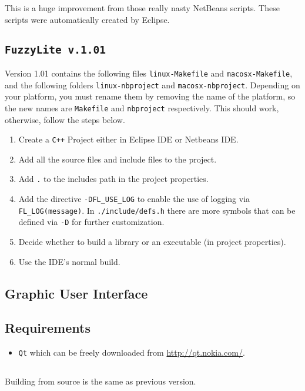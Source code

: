 	This is a huge improvement from those really nasty NetBeans scripts. These
	scripts were automatically created by Eclipse.

\subsection{\texttt{FuzzyLite v.1.01}}

	Version 1.01 contains the following files \texttt{linux-Makefile} and \texttt{macosx-Makefile}, and the following folders \texttt{linux-nbproject} and \texttt{macosx-nbproject}. Depending on your platform, you must rename them by removing the name of the platform, so the new names are \texttt{Makefile} and \texttt{nbproject} respectively. This should work, otherwise, follow the steps below.

	\begin{enumerate}
		\item Create a \texttt{C++} Project either in Eclipse IDE or Netbeans IDE.
		\item Add all the source files and include files to the project.
		\item Add \texttt{.} to the includes path in the project properties.
		\item Add the directive \texttt{-DFL\_USE\_LOG} to enable the use of logging via \texttt{FL\_LOG(message)}. In \texttt{./include/defs.h} there are more symbols that can be defined via \texttt{-D} for further customization.
		\item Decide whether to build a library or an executable (in project properties).
		\item Use the IDE's normal build.
	\end{enumerate}

\subsection{Graphic User Interface}
	\subsection{Requirements}
	\begin{itemize}
	  \item \texttt{Qt} which can be freely downloaded from
	  \url{http://qt.nokia.com/}.
	  
\end{itemize}
	\subsection{\fl}
		Building from source is the same as previous version.
		
